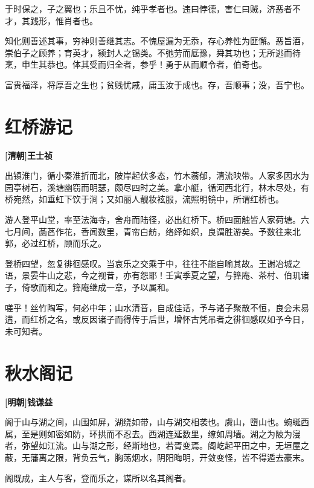 \documentclass[UTF8,titlepage,oneside]{ctexbook}
\begin{document}
于时保之，子之翼也；乐且不忧，纯乎孝者也。违曰悖德，害仁曰贼，济恶者不才，其践形，惟肖者也。


知化则善述其事，穷神则善继其志。不愧屋漏为无忝，存心养性为匪懈。恶旨酒，崇伯子之顾养；育英才，颍封人之锡类。不弛劳而厎豫，舜其功也；无所逃而待烹，申生其恭也。体其受而归全者，参乎！勇于从而顺令者，伯奇也。


富贵福泽，将厚吾之生也；贫贱忧戚，庸玉汝于成也。存，吾顺事；没，吾宁也。



\chapter*{红桥游记}
\begin{center}
	\textbf{[清朝]王士祯}
\end{center}


出镇淮门，循小秦淮折而北，陂岸起伏多态，竹木蓊郁，清流映带。人家多因水为园亭树石，溪塘幽窃而明瑟，颇尽四时之美。拿小艇，循河西北行，林木尽处，有桥宛然，如垂虹下饮于涧；又如丽人靓妆袨服，流照明镜中，所谓红桥也。


游人登平山堂，率至法海寺，舍舟而陆径，必出红桥下。桥四面触皆人家荷塘。六七月间，菡萏作花，香闻数里，青帘白舫，络绎如织，良谓胜游矣。予数往来北郭，必过红桥，顾而乐之。


登桥四望，忽复徘徊感叹。当哀乐之交乘于中，往往不能自喻其故。王谢冶城之语，景晏牛山之悲，今之视昔，亦有怨耶！壬寅季夏之望，与箨庵、茶村、伯玑诸子，倚歌而和之。箨庵继成一章，予以属和。


嗟乎！丝竹陶写，何必中年；山水清音，自成佳话，予与诸子聚散不恒，良会未易遘，而红桥之名，或反因诸子而得传于后世，增怀古凭吊者之徘徊感叹如予今日，未可知者。



\chapter*{秋水阁记}
\begin{center}
	\textbf{[明朝]钱谦益}
\end{center}


阁于山与湖之间，山围如屏，湖绕如带，山与湖交相袭也。虞山，嶞山也。蜿蜒西属，至是则如密如防，环拱而不忍去。西湖连延数里，缭如周墙。湖之为陂为寖者，弥望如江流。山与湖之形，经斯地也，若胥变焉。阁屹起平田之中，无垣屋之蔽，无藩离之限，背负云气，胸荡烟水，阴阳晦明，开敛变怪，皆不得遁去豪末。


阁既成，主人与客，登而乐之，谋所以名其阁者。
\end{document}
